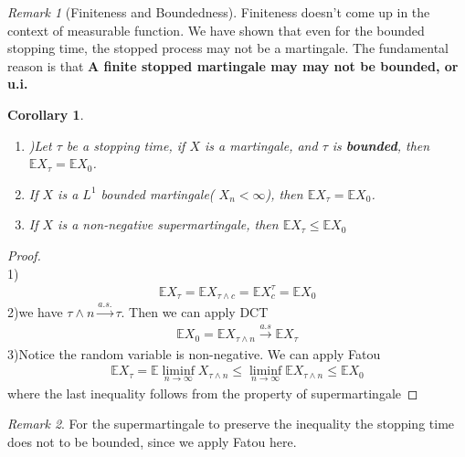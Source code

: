 \documentclass[a4paper,11pt]{book}
\newtheorem{corollary}{Corollary}[theorem]
\theoremstyle{definition}
\theoremstyle{remark}
\newtheorem*{remark}{Remark}
\begin{document}
\begin{remark}[Finiteness and Boundedness]
	Finiteness doesn't come up in the context of measurable function. We have shown that even for the bounded stopping time, the stopped process may not be a martingale. The fundamental reason is that \textbf{A finite stopped martingale may may not be bounded, or u.i.}
\end{remark}


\begin{corollary}\quad
\begin{enumerate}
	\item )Let $\tau$ be a stopping time, if $X$ is a martingale, and $\tau$ is \textbf{bounded}, then $\mathbb{E}X_\tau = \mathbb{E}X_0$.
	\item If $X$ is a $L^1$ bounded martingale( $X_n < \infty$), then $\mathbb{E}X_\tau = \mathbb{E}X_0$.
	\item If $X$ is a non-negative supermartingale, then $\mathbb{E} X_\tau \leq \mathbb{E} X_0$
\end{enumerate}
\end{corollary}

\begin{proof}\quad\\
	1)
	\begin{align*}
		\mathbb{E}X_\tau = \mathbb{E} X_{\tau \wedge c} = \mathbb{E}X^\tau_c = \mathbb{E} X_0
	\end{align*}
	2)we have $\tau \wedge n  \overset{a.s.}{\rightarrow} \tau$. Then we can apply DCT
	\begin{align*}
		\mathbb{E}X_0 = \mathbb{E} X_{\tau \wedge n} \overset{a.s}{\rightarrow} \mathbb{E} X_\tau
	\end{align*}
	3)Notice the random variable is non-negative. We can apply Fatou
	\begin{align*}
		\mathbb{E}X_\tau = \mathbb{E} \liminf_{n \rightarrow \infty} X_{\tau \wedge n} \leq \liminf_{n \rightarrow \infty} \mathbb{E} X_{\tau \wedge n} \leq \mathbb{E} X_0
	\end{align*}
	where the last inequality follows from the property of supermartingale 
\end{proof}
\begin{remark}
For the supermartingale to preserve the inequality the stopping time does not to be bounded, since we apply Fatou here.	
\end{remark}
\end{document}
